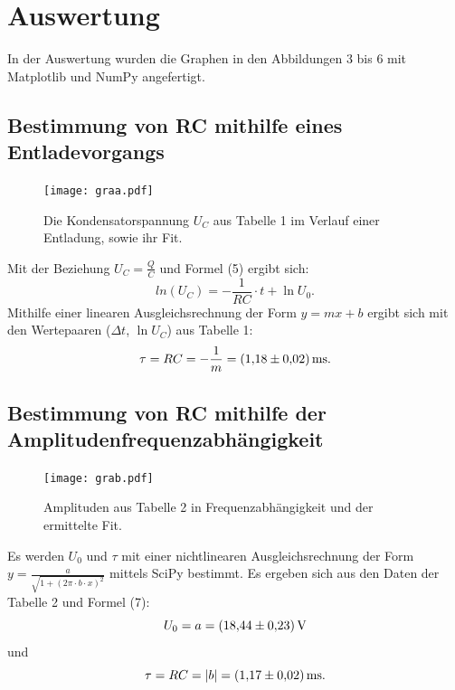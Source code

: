 \newpage
\section{Auswertung}
\label{sec:Auswertung}
In der Auswertung wurden die Graphen in den Abbildungen 3 bis 6 mit Matplotlib \cite{matplotlib} und NumPy \cite{numpy} angefertigt.

\subsection{Bestimmung von RC mithilfe eines Entladevorgangs}
\begin{figure}[H]
	\centering
	\caption{Die Kondensatorspannung $U_C$ aus Tabelle 1 im Verlauf einer Entladung, sowie ihr Fit.}
	\texttt{[image: graa.pdf]}
	\label{fig:graa}
\end{figure}


Mit der Beziehung $U_C = \frac{Q}{C}$ und Formel (5) ergibt sich:
\begin{displaymath}
ln(U_C) = -\frac{1}{RC}\cdot t + \ln U_0\text{.}
\end{displaymath}
Mithilfe einer linearen Ausgleichsrechnung der Form $y = mx+b$ ergibt sich mit den Wertepaaren ($\Delta t$, $\ln U_C$) aus Tabelle 1:
\begin{displaymath}
\tau = RC = -\frac{1}{m} = \SI{1.18 \pm 0.02}{\milli\second}\text{.}
\end{displaymath}
\subsection{Bestimmung von RC mithilfe der Amplitudenfrequenzabhängigkeit}
\begin{figure}[H]
	\centering
	\caption{Amplituden aus Tabelle 2 in Frequenzabhängigkeit und der ermittelte Fit.}
	\texttt{[image: grab.pdf]}
	\label{fig:grab}
\end{figure}

Es werden $U_0$ und $\tau$ mit einer nichtlinearen Ausgleichsrechnung der Form $y = \frac{a}{\sqrt{1+(2\pi \cdot b\cdot x)^2}}$ mittels SciPy \cite{scipy} bestimmt. Es ergeben sich aus den Daten der Tabelle 2 und Formel (7):
\begin{displaymath}
U_0 = a = \SI{18.44 \pm 0.23}{\volt}
\end{displaymath}
und
\begin{displaymath}
\tau = RC = |b| = \SI{1.17 \pm 0.02}{\milli\second}\text{.}
\end{displaymath}

